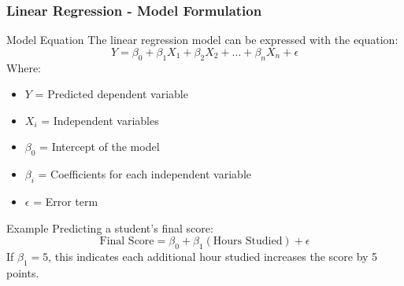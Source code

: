 \documentclass[aspectratio=169]{beamer}
\begin{document}
\begin{frame}[fragile]
    \frametitle{Linear Regression - Model Formulation}
    \begin{block}{Model Equation}
        The linear regression model can be expressed with the equation:
        \begin{equation}
            Y = \beta_0 + \beta_1 X_1 + \beta_2 X_2 + \ldots + \beta_n X_n + \epsilon 
        \end{equation}
        Where:
        \begin{itemize}
            \item \(Y\) = Predicted dependent variable
            \item \(X_i\) = Independent variables
            \item \(\beta_0\) = Intercept of the model
            \item \(\beta_i\) = Coefficients for each independent variable
            \item \(\epsilon\) = Error term
        \end{itemize}
    \end{block}

    \begin{block}{Example}
        Predicting a student's final score:
        \[
        \text{Final Score} = \beta_0 + \beta_1 (\text{Hours Studied}) + \epsilon 
        \]
        If \(\beta_1 = 5\), this indicates each additional hour studied increases the score by 5 points.
    \end{block}
\end{frame}
\end{document}

